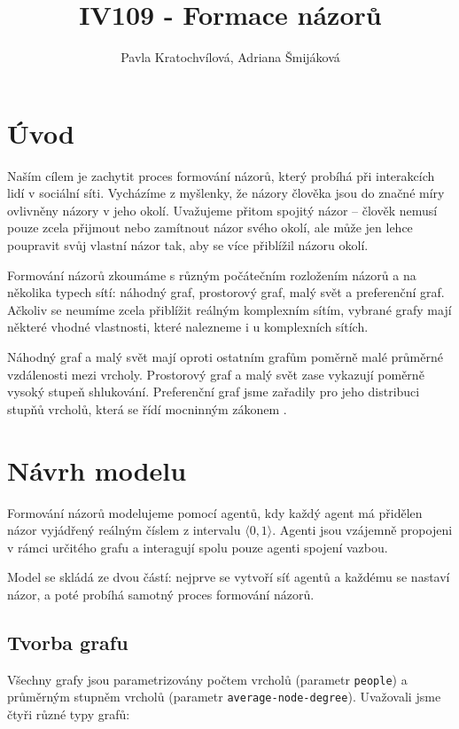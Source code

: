 \documentclass[10pt,a4paper]{report}
\author{Pavla Kratochvílová, Adriana Šmijáková}
\title{IV109 - Formace názorů}
\begin{document}
\maketitle
\chapter{Úvod}
Naším cílem je zachytit proces formování názorů, který probíhá při interakcích lidí v sociální síti. Vycházíme z myšlenky, že názory člověka jsou do značné míry ovlivněny názory v jeho okolí. Uvažujeme přitom spojitý názor -- člověk nemusí pouze zcela přijmout nebo zamítnout názor svého okolí, ale může jen lehce poupravit svůj vlastní názor tak, aby se více přiblížil názoru okolí. 

Formování názorů zkoumáme s různým počátečním rozložením názorů a na několika typech sítí: náhodný graf, prostorový graf, malý svět a preferenční graf. Ačkoliv se neumíme zcela přiblížit reálným komplexním sítím, vybrané grafy mají některé vhodné vlastnosti, které nalezneme i u komplexních sítích. 

Náhodný graf a malý svět mají oproti ostatním grafům poměrně malé prů\-měr\-né vzdálenosti mezi vrcholy. Prostorový graf a malý svět zase vykazují poměrně vysoký stupeň shlukování. Preferenční graf jsme zařadily pro jeho distribuci stupňů vrcholů, která se řídí mocninným zákonem \cite{zdroj}.

\chapter{Návrh modelu}
Formování názorů modelujeme pomocí agentů, kdy každý agent má přidělen názor vyjádřený reálným číslem z intervalu $\langle 0, 1 \rangle$. Agenti jsou vzájemně propojeni v rámci určitého grafu a interagují spolu pouze agenti spojení vazbou.

Model se skládá ze dvou částí: nejprve se vytvoří síť agentů a každému se nastaví názor, a poté probíhá samotný proces formování názorů.

\section{Tvorba grafu}
Všechny grafy jsou parametrizovány počtem vrcholů (parametr \texttt{people}) a prů\-měr\-ným stupněm vrcholů (parametr \texttt{average-node-degree}). Uvažovali jsme čtyři různé typy grafů:
\end{document}
